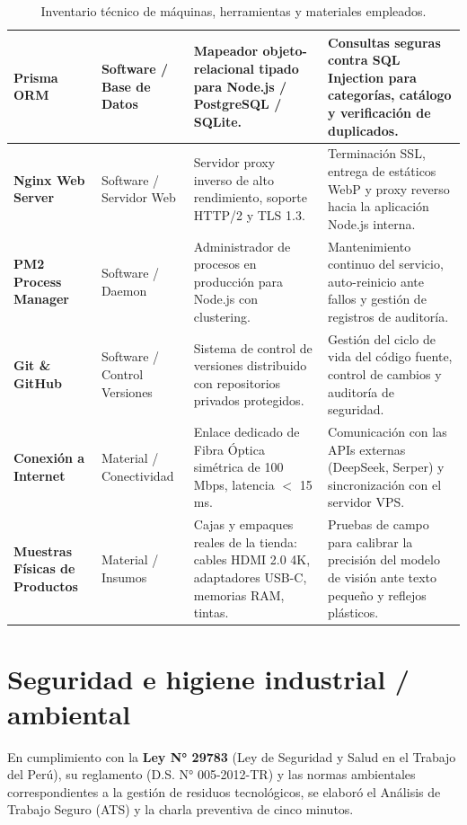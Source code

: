 \documentclass[11pt,a4paper]{article}
\begin{document}
\begin{table}[htbp]
\begin{tabularx}{\textwidth}{p{3.2cm} p{2.8cm} p{4.2cm} X}
\textbf{Prisma ORM} & Software / Base de Datos & Mapeador objeto-relacional tipado para Node.js / PostgreSQL / SQLite. & Consultas seguras contra SQL Injection para categorías, catálogo y verificación de duplicados. \\
\midrule
\rowcolor{lightrow}
\textbf{Nginx Web Server} & Software / Servidor Web & Servidor proxy inverso de alto rendimiento, soporte HTTP/2 y TLS 1.3. & Terminación SSL, entrega de estáticos WebP y proxy reverso hacia la aplicación Node.js interna. \\
\midrule
\textbf{PM2 Process Manager} & Software / Daemon & Administrador de procesos en producción para Node.js con clustering. & Mantenimiento continuo del servicio, auto-reinicio ante fallos y gestión de registros de auditoría. \\
\midrule
\rowcolor{lightrow}
\textbf{Git \& GitHub} & Software / Control Versiones & Sistema de control de versiones distribuido con repositorios privados protegidos. & Gestión del ciclo de vida del código fuente, control de cambios y auditoría de seguridad. \\
\midrule
\textbf{Conexión a Internet} & Material / Conectividad & Enlace dedicado de Fibra Óptica simétrica de 100 Mbps, latencia $<$ 15 ms. & Comunicación con las APIs externas (DeepSeek, Serper) y sincronización con el servidor VPS. \\
\midrule
\rowcolor{lightrow}
\textbf{Muestras Físicas de Productos} & Material / Insumos & Cajas y empaques reales de la tienda: cables HDMI 2.0 4K, adaptadores USB-C, memorias RAM, tintas. & Pruebas de campo para calibrar la precisión del modelo de visión ante texto pequeño y reflejos plásticos. \\
\bottomrule
\end{tabularx}
\caption{Inventario técnico de máquinas, herramientas y materiales empleados.}
\end{table}

\newpage

\section{Seguridad e higiene industrial / ambiental}

En cumplimiento con la \textbf{Ley N° 29783} (Ley de Seguridad y Salud en el Trabajo del Perú), su reglamento (D.S. N° 005-2012-TR) y las normas ambientales correspondientes a la gestión de residuos tecnológicos, se elaboró el Análisis de Trabajo Seguro (ATS) y la charla preventiva de cinco minutos.
\end{document}
